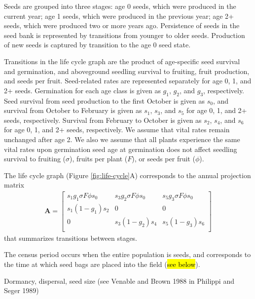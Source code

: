 \documentclass[12pt, oneside, titlepage]{article}   	%
\begin{document}
{\iffalse

 Seeds are grouped into three stages: age 0 seeds, which were produced in the current year; age 1 seeds, which were produced in the previous year; age 2+ seeds, which were produced two or more years ago. Persistence of seeds in the seed bank is represented by transitions from younger to older seeds. Production of new seeds is captured by transition to the age 0 seed state. 
 
Transitions in the life cycle graph are the product of age-specific seed survival and germination, and aboveground seedling survival to fruiting, fruit production, and seeds per fruit. Seed-related rates are represented separately for age 0, 1, and 2+ seeds. Germination for each age class is given as $g_1$, $g_2$, and $g_3$, respectively. Seed survival from seed production to the first October is given as $s_0$, and survival from October to February is given as $s_1$, $s_3$, and $s_5$ for age 0, 1, and 2+ seeds, respectively. Survival from February to October is given as $s_2$, $s_4$, and $s_6$ for age 0, 1, and 2+ seeds, respectively. We assume that vital rates remain unchanged after age 2. We also we assume that all plants experience the same vital rates upon germination seed age at germination does not affect seedling survival to fruiting ($\sigma$), fruits per plant ($F$), or seeds per fruit ($\phi$).

The life cycle graph (Figure \ref{fig:life-cycle}A) corresponds to the annual projection matrix
%
\begin{gather}
\bm{A} = 
\begin{bmatrix} 
s_1 g_1 \sigma F \phi s_0 & s_3 g_2 \sigma F \phi s_0 & s_5 g_3 \sigma F \phi s_0 \\
s_1 (1-g_1) s_2 & 0 & 0 \\
0 & s_3 (1-g_2) s_4  & s_5 (1-g_3) s_6  \\
\end{bmatrix}
\label{eq:projection-matrix}
\end{gather} 
%
that summarizes transitions between stages. 

The census period occurs when the entire population is seeds, and corresponds to the time at which seed bags are placed into the field (\hl{see below}).

Dormancy, dispersal, seed size (see Venable and Brown 1988 in Philippi and Seger 1989)


}
\end{document}
